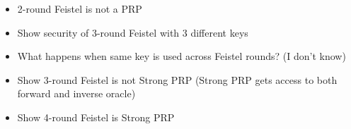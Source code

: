 \begin{itemize}
  \item 2-round Feistel is not a PRP
  \item Show security of 3-round Feistel with 3 different keys
  \item What happens when same key is used across Feistel rounds? (I don't know)
  \item Show 3-round Feistel is not Strong PRP (Strong PRP gets access to both forward and inverse oracle) 
  \item Show 4-round Feistel is Strong PRP
\end{itemize}
